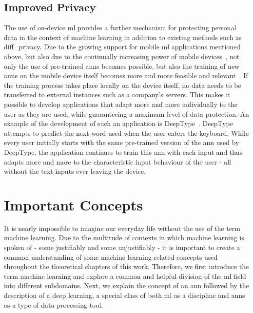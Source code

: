 \documentclass[
			   fontsize=11pt,
               paper=a4,
               bibliography=totoc,
               idxtotoc,
               headsepline,
               footsepline,
               footinclude=false,
               BCOR=12mm,
               DIV=13,
               openany,   %
               ]
               {scrbook}
\begin{document}
\section{Improved Privacy} \label{sec:privacy}

The use of on-device \gls{ml} provides a further mechanism for protecting personal data in the context of machine learning in addition to existing methods such as \gls{diff_privacy}. Due to the growing support for mobile \gls{ml} applications mentioned above, but also due to the continually increasing power of mobile devices~\cite{mobile_cpu_power}, not only the use of pre-trained \glspl{ann} becomes possible, but also the training of new \glspl{ann} on the mobile device itself becomes more and more feasible and relevant~\cite{liu19}. If the training process takes place locally on the device itself, no data needs to be transferred to external instances such as a company's servers. This makes it possible to develop applications that adapt more and more individually to the user as they are used, while guaranteeing a maximum level of data protection. An example of the development of such an application is DeepType~\cite{deepType}. DeepType attempts to predict the next word used when the user enters the keyboard. While every user initially starts with the same pre-trained version of the \gls{ann} used by DeepType, the application continues to train this \gls{ann} with each input and thus adapts more and more to the characteristic input behaviour of the user - all without the text inputs ever leaving the device.


\chapter{Important Concepts}

It is nearly impossible to imagine our everyday life without the use of the term machine learning. Due to the multitude of contexts in which machine learning is spoken of - some justifiably and some unjustifiably - it is important to create a common understanding of some machine learning-related concepts used throughout the theoretical chapters of this work. Therefore, we first introduce the term machine learning and explore a common and helpful division of the \acrlong{ml} field into different subdomains. Next, we explain the concept of an \acrlong{ann} followed by the description of a deep learning, a special class of both \acrfull{ml} as a discipline and \glspl{ann} as a type of data processing tool.
\end{document}
